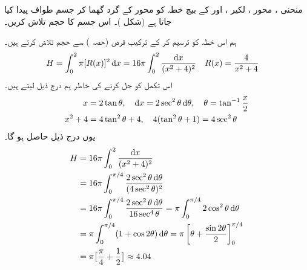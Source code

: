 منحنی ، محور ، لکیر  ، اور  کے بیچ خطہ کو محور  کے گرد گھما کر جسم طواف پیدا کیا جاتا ہے (شکل )۔ اس جسم کا حجم تلاش کریں۔

ہم اس خطہ کو ترسیم کر کے ترکیب قرص (حصہ ) سے حجم تلاش کرتے ہیں۔
\begin{align*}
H&=\int_0^2\pi[R(x)]^2\dif x=16\pi\int_0^2\frac{\dif x}{(x^2+4)^2}&&R(x)=\frac{4}{x^2+4}
\end{align*}
اس تکمل کو حل کرنے کی خاطر ہم درج ذیل لیتے ہیں۔
\begin{align*}
x&=2\tan\theta,\quad \dif x=2\sec^2\theta\dif\theta,\quad \theta=\tan^{-1}\frac{x}{2}\\
x^2+4&=4\tan^2\theta+4,\quad 4(\tan^2\theta+1)=4\sec^2\theta 
\end{align*}
یوں درج ذیل حاصل ہو گا۔
\begin{align*}
H&=16\pi\int_0^2\frac{\dif x}{(x^2+4)^2}\\
&=16\pi\int_0^{\pi/4}\frac{2\sec^2\theta\dif\theta}{(4\sec^2\theta)^2}\\
&=16\pi\int_0^{\pi/4}\frac{2\sec^2\theta\dif\theta}{16\sec^4\theta}=\pi\int_0^{\pi/4}2\cos^2\theta\dif\theta\\
&=\pi\int_0^{\pi/4}(1+\cos 2\theta)\dif \theta=\pi\left[\theta+\frac{\sin2\theta}{2}\right]_0^{\pi/4}\\
&=\pi\big[\frac{\pi}{4}+\frac{1}{2}\big]\approx 4.04
\end{align*}
